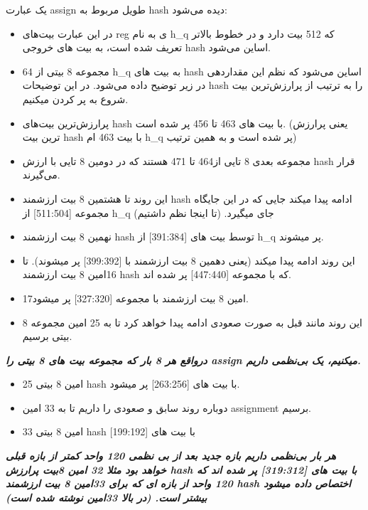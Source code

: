 یک عبارت assign طویل مربوط به hash دیده می‌شود:

\begin{itemize}
\item
در این عبارت بیت‌های reg ی به نام
 h\_q 
که 512 بیت دارد و در خطوط بالاتر تعریف شده است، به بیت های خروجی hash اساین می‌شود.
\item
64 مجموعه 8 بیتی از h\_q به بیت های hash اساین می‌شود که نظم این مقداردهی در زیر توضیح داده می‌شود. در این توضیحات hash را به ترتیب از پرارزش‌ترین بیت شروع به پر کردن میکنیم.
\item
پرارزش‌ترین بیت‌های hash با بیت های 463 تا 456 پر شده است. (یعنی پرارزش ترین بیت hash با بیت 463 ام h\_q پر شده است و به همین ترتیب)
\item
مجموعه بعدی 8 تایی از464 تا 471 هستند که در دومین 8 تایی با ارزش hash قرار می‌گیرند.
\item
این روند تا هشتمین 8 بیت ارزشمند hash ادامه پیدا میکند جایی که در این جایگاه مجموعه [511:504] از h\_q جای میگیرد. (تا اینجا نظم داشتیم)
\item
نهمین 8 بیت ارزشمند hash توسط بیت های [391:384] از h\_q پر میشوند.
\item
این روند ادامه پیدا میکند (یعنی دهمین 8 بیت ارزشمند با [399:392] پر میشوند).
تا 16امین 8 بیت ارزشمند hash که با مجموعه [447:440] پر شده اند.
\item
17امین 8 بیت ارزشمند با مجموعه [327:320] پر میشود.
\item
این روند مانند قبل به صورت صعودی ادامه پیدا خواهد کرد تا به 25 امین مجموعه 8 بیتی برسیم.

\end{itemize}

\textit{\textbf{درواقع هر 8 بار که مجموعه بیت های 8 بیتی را assign میکنیم، یک بی‌نظمی داریم.
}}
\begin{itemize}
\item
25 امین 8 بیتی hash با بیت های [263:256] پر میشود.
\item
دوباره روند سابق و صعودی را داریم تا به 33 امین assignment برسیم.
\item
33 امین 8 بیتی hash با بیت های [199:192]

\end{itemize}

\textit{\textbf{هر بار بی‌نظمی داریم بازه جدید بعد از بی نظمی 120 واحد کمتر از بازه قبلی خواهد بود مثلا 32 امین 8بیت پرارزش hash با بیت های [319:312] پر شده اند که 120 واحد از بازه ای که برای 33امین 8 بیت ارزشمند hash اختصاص داده میشود بیشتر است. (در بالا 33امین نوشته شده است)}}

